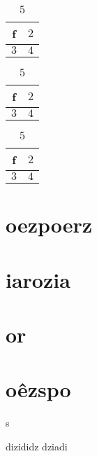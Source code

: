 \documentclass{article}
\begin{document}
\begin{table}[h!]
    \centering
    \begin{tabular}{|c|c|}
        \hline
        f & $2$ \\
        \hline
        $3$ & $4$ \\
        \hline
    \end{tabular}
    \caption{$5$}
    \label{tab:my_label}
\end{table}

\begin{table}[h!]
    \centering
    \begin{tabular}{|c|c|}
        \hline
        f & $2$ \\
        \hline
        $3$ & $4$ \\
        \hline
    \end{tabular}
    \caption{$5$}
    \label{tab:my_label}
\end{table}

\begin{table}[h!]
    \centering
    \begin{tabular}{|c|c|}
        \hline
        f & $2$ \\
        \hline
        $3$ & $4$ \\
        \hline
    \end{tabular}
    \caption{$5$}
    \label{tab:my_label}
\end{table}

\section{oezpoerz}

\section{iarozia}

\section{or}

\section{oêzspo}
s

dizididz
dziadi
\end{document}
